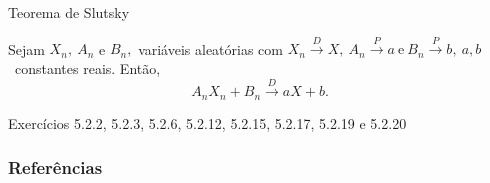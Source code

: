 \documentclass[12pt]{beamer}
\begin{document}
\begin{frame}{Teorema de Slutsky}
\begin{Teorema}
\justifying
Sejam $X_{n},~A_{n}$ e $B_{n},$ variáveis aleatórias com $X_{n} \overset{D}{\rightarrow} X,~A_{n} \overset{P}{\rightarrow} a~\text{e}~B_{n} \overset{P}{\rightarrow} b,~a,b$~constantes reais. Então, $$A_{n}X_{n}+B_{n} \overset{D}{\rightarrow} aX+b.$$
\end{Teorema}
\end{frame}

\begin{frame}{}
\begin{block}{\Home}
	\nocite{hogg}
\justifying
Exercícios 5.2.2, 5.2.3, 5.2.6, 5.2.12, 5.2.15, 5.2.17, 5.2.19 e 5.2.20
\end{block}
\end{frame}

\begin{frame}[allowframebreaks]
\frametitle{\bf Referências}
\printbibliography
\end{frame}
\end{document}
